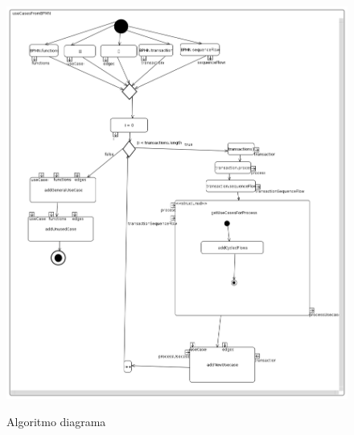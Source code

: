 \begin{figure}[H]
	\centering
	\caption{Algoritmo diagrama}
	\includegraphics[scale=0.5]{img/algorythm-activity-diagram}
	\label{img:algorythm_activity_diagram}
\end{figure} 

